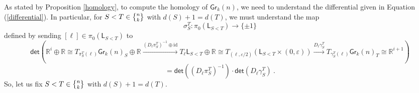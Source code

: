 \documentclass{article}
\newcommand{\bb}[1]{\mathbb{#1}}
\newcommand{\msf}[1]{\mathsf{#1}}
\newcommand{\link}{\msf{Link}}
\newcommand{\gr}{\msf{Gr}}
\newcommand{\pr}{\msf{pr}}
\newcommand{\nchoosek}{\textstyle\genfrac{\lbrace}{\rbrace}{0pt}{}}
\newcommand{\rot}{\msf{Rot}}
\newtheorem{corollary}[theorem]{Corollary}
\theoremstyle{definition}
\begin{document}


As stated by Proposition \ref{homology}, to compute the homology of $\gr_k(n)$, we need to understand
the differential given in Equation (\ref{differential}). In particular, for 
$S<T \in \nchoosek{n}{k}$ with $d(S) +1 = d(T)$, we must understand the map
$$\sigma_S^T: \pi_0(\msf{L}_{S<T}) \to \{\pm1\}$$
defined by sending $[\ell] \in \pi_0(\msf{L}_{S<T})$ to 
$$\msf{det}\left(\bb{R}^i \oplus \bb{R} \cong T_{\pi_S^T(\ell)} \gr_k(n)_S \oplus \bb{R} 
    \xrightarrow{(D_\ell \pi_S^T)^{-1} \oplus \text{id}} T_\ell \msf{L}_{S<T} \oplus \bb{R} \cong
    T_{(\ell,\varepsilon/2)} (\msf{L}_{S<T} \times (0,\varepsilon)) \xrightarrow{D_\ell \gamma_S^T} T_{\gamma_S^T(\ell)}\gr_k(n)_T \cong \bb{R}^{i+1}\right)$$
$$=\msf{det}\left((D_\ell \pi_S^T)^{-1}\right) \cdot \msf{det}\left(D_\ell \gamma_S^T\right)~.$$
So, let us fix $S<T \in \nchoosek{n}{k}$ with $d(S)+1=d(T)$.  \\

\end{document}
